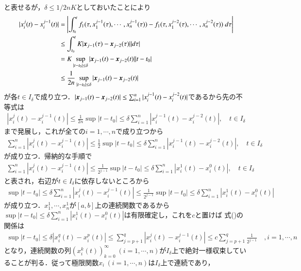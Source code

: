 \begin{prf}
\begin{description}
			と表せるが，$\delta \leq 1/2nK$としておいたことにより
			\begin{align}
				|x_i^j(t) - x_i^{j-1}(t)| &= \left| \int_{t_0}^t f_1(\tau,x_1^{j-1}(\tau), \cdots, x_n^{j-1}(\tau)) - f_1(\tau,x_1^{j-2}(\tau), \cdots, x_n^{j-2}(\tau))\ d\tau \right| \\
					&\leq \int_{t_0}^t K|\mbox{\boldmath $x$}_{j-1}(\tau) - \mbox{\boldmath $x$}_{j-2}(\tau)| |d\tau| \\
					&= K\operatorname*{sup}_{|t - t_0|\leq \delta} |\mbox{\boldmath $x$}_{j-1}(t) - \mbox{\boldmath $x$}_{j-2}(t)| |t-t_0| \\
					&\leq \frac{1}{2n} \operatorname*{sup}_{|t - t_0|\leq \delta} |\mbox{\boldmath $x$}_{j-1}(t) - \mbox{\boldmath $x$}_{j-2}(t)|
			\end{align}
			が各$t \in I_\delta$で成り立つ．$|\mbox{\boldmath $x$}_{j-1}(t) - \mbox{\boldmath $x$}_{j-2}(t)| \leq \sum_{i=1}^{n}|x_i^{j-1}(t) - x_i^{j-2}(t)|$であるから先の不等式は
			\begin{align}
				|x_i^j(t) - x_i^{j-1}(t)| \leq \frac{1}{2n} \sup{|t - t_0|\leq \delta}{\sum_{i=1}^{n}|x_i^{j-1}(t) - x_i^{j-2}(t)|}, \quad t \in I_\delta
			\end{align}
			まで発展し，これが全ての$i = 1, \cdots, n$で成り立つから
			\begin{align}
				\sum_{i=1}^{n}|x_i^j(t) - x_i^{j-1}(t)| \leq \frac{1}{2} \sup{|t - t_0|\leq \delta}{\sum_{i=1}^{n}|x_i^{j-1}(t) - x_i^{j-2}(t)|}, \quad t \in I_\delta
			\end{align}
			が成り立つ．帰納的な手順で
			\begin{align}
				\sum_{i=1}^{n}|x_i^j(t) - x_i^{j-1}(t)| \leq \frac{1}{2^{j-1}} \sup{|t - t_0|\leq \delta}{\sum_{i=1}^{n}|x_i^{1}(t) - x_i^{0}(t)|}, \quad t \in I_\delta
			\end{align}
			と表され，右辺が$t \in I_\delta$に依存しないところから
			\begin{align}
				\sup{|t - t_0|\leq \delta}{\sum_{i=1}^{n}|x_i^j(t) - x_i^{j-1}(t)|} \leq \frac{1}{2^{j-1}} \sup{|t - t_0|\leq \delta}{\sum_{i=1}^{n}|x_i^{1}(t) - x_i^{0}(t)|}
			\end{align}
			が成り立つ．$x_1^1, \cdots, x_n^1$が$[a,b]$上の連続関数であるから$\sup{|t - t_0|\leq \delta}{\sum_{i=1}^{n}|x_i^{1}(t) - x_i^{0}(t)|}$は有限確定し，これを$c$と置けば
			式()の関係は
			\begin{align}
				\sup{|t - t_0|\leq \delta}{|x_i^q(t) - x_i^p(t)|} \leq \sum_{j=p+1}^{q}|x_i^j(t) - x_i^{j-1}(t)| \leq c \sum_{j=p+1}^{q} \frac{1}{2^{j-1}} \quad, i=1,\cdots,n
			\end{align}
			となり，連続関数の列$\left(x_i^k(t)\right)_{k = 0}^{\infty} \ (i=1,\cdots,n)$が$I_\delta$上で絶対一様収束していることが判る．従って極限関数$x_i\ (i=1,\cdots,n)$は$I_\delta$上で連続であり，

\end{description}
\end{prf}
